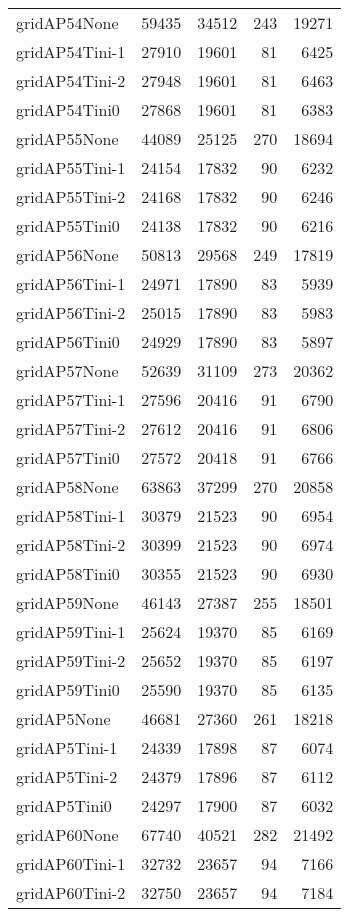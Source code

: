 \begin{longtable}{lrrrr}
gridAP54None & 59435 & 34512 & 243 & 19271 \\
gridAP54Tini-1 & 27910 & 19601 & 81 & 6425 \\
gridAP54Tini-2 & 27948 & 19601 & 81 & 6463 \\
gridAP54Tini0 & 27868 & 19601 & 81 & 6383 \\
gridAP55None & 44089 & 25125 & 270 & 18694 \\
gridAP55Tini-1 & 24154 & 17832 & 90 & 6232 \\
gridAP55Tini-2 & 24168 & 17832 & 90 & 6246 \\
gridAP55Tini0 & 24138 & 17832 & 90 & 6216 \\
gridAP56None & 50813 & 29568 & 249 & 17819 \\
gridAP56Tini-1 & 24971 & 17890 & 83 & 5939 \\
gridAP56Tini-2 & 25015 & 17890 & 83 & 5983 \\
gridAP56Tini0 & 24929 & 17890 & 83 & 5897 \\
gridAP57None & 52639 & 31109 & 273 & 20362 \\
gridAP57Tini-1 & 27596 & 20416 & 91 & 6790 \\
gridAP57Tini-2 & 27612 & 20416 & 91 & 6806 \\
gridAP57Tini0 & 27572 & 20418 & 91 & 6766 \\
gridAP58None & 63863 & 37299 & 270 & 20858 \\
gridAP58Tini-1 & 30379 & 21523 & 90 & 6954 \\
gridAP58Tini-2 & 30399 & 21523 & 90 & 6974 \\
gridAP58Tini0 & 30355 & 21523 & 90 & 6930 \\
gridAP59None & 46143 & 27387 & 255 & 18501 \\
gridAP59Tini-1 & 25624 & 19370 & 85 & 6169 \\
gridAP59Tini-2 & 25652 & 19370 & 85 & 6197 \\
gridAP59Tini0 & 25590 & 19370 & 85 & 6135 \\
gridAP5None & 46681 & 27360 & 261 & 18218 \\
gridAP5Tini-1 & 24339 & 17898 & 87 & 6074 \\
gridAP5Tini-2 & 24379 & 17896 & 87 & 6112 \\
gridAP5Tini0 & 24297 & 17900 & 87 & 6032 \\
gridAP60None & 67740 & 40521 & 282 & 21492 \\
gridAP60Tini-1 & 32732 & 23657 & 94 & 7166 \\
gridAP60Tini-2 & 32750 & 23657 & 94 & 7184 \\

\end{longtable}
